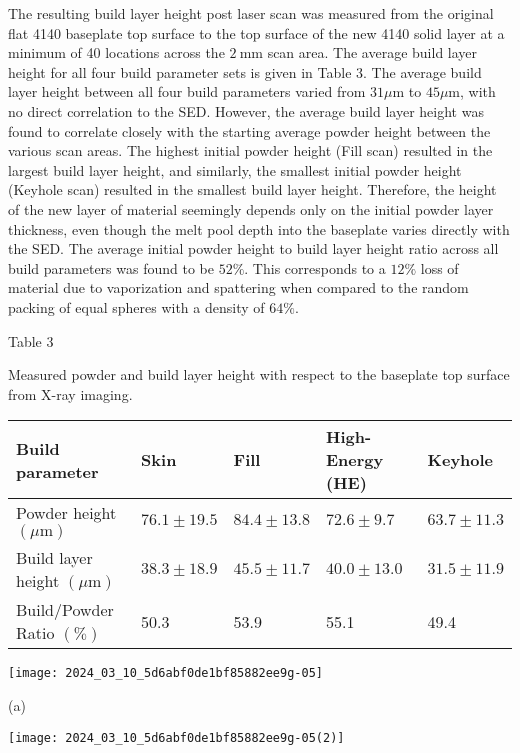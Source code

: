 \documentclass[10pt]{article}
\begin{document}
The resulting build layer height post laser scan was measured from the original flat 4140 baseplate top surface to the top surface of the new 4140 solid layer at a minimum of 40 locations across the $2 \mathrm{~mm}$ scan area. The average build layer height for all four build parameter sets is given in Table 3. The average build layer height between all four build parameters varied from $31 \mu \mathrm{m}$ to $45 \mu \mathrm{m}$, with no direct correlation to the SED. However, the average build layer height was found to correlate closely with the starting average powder height between the various scan areas. The highest initial powder height (Fill scan) resulted in the largest build layer height, and similarly, the smallest initial powder height (Keyhole scan) resulted in the smallest build layer height. Therefore, the height of the new layer of material seemingly depends only on the initial powder layer thickness, even though the melt pool depth into the baseplate varies directly with the SED. The average initial powder height to build layer height ratio across all build parameters was found to be $52 \%$. This corresponds to a $12 \%$ loss of material due to vaporization and spattering when compared to the random packing of equal spheres with a density of $64 \%$.

Table 3

Measured powder and build layer height with respect to the baseplate top surface from $\mathrm{X}$-ray imaging.

\begin{center}
\begin{tabular}{lllll}
\hline
Build parameter & Skin & Fill & High-Energy (HE) & Keyhole \\
\hline
Powder height $(\mu \mathrm{m})$ & $76.1 \pm 19.5$ & $84.4 \pm 13.8$ & $72.6 \pm 9.7$ & $63.7 \pm 11.3$ \\
Build layer height $(\mu \mathrm{m})$ & $38.3 \pm 18.9$ & $45.5 \pm 11.7$ & $40.0 \pm 13.0$ & $31.5 \pm 11.9$ \\
Build/Powder Ratio $(\%)$ & 50.3 & 53.9 & 55.1 & 49.4 \\
\hline
\end{tabular}
\end{center}

\begin{center}
\texttt{[image: 2024\_03\_10\_5d6abf0de1bf85882ee9g-05]}
\end{center}

(a)

\begin{center}
\texttt{[image: 2024\_03\_10\_5d6abf0de1bf85882ee9g-05(2)]}
\end{center}
\end{document}

